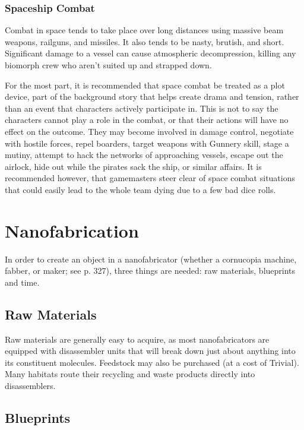 \subsubsection{Spaceship Combat} 

Combat in space tends to take place over long distances using massive beam weapons, railguns, and missiles. It also tends to be nasty, brutish, and short. Significant damage to a vessel can cause atmospheric decompression, killing any biomorph crew who aren't suited up and strapped down. 

For the most part, it is recommended that space combat be treated as a plot device, part of the background story that helps create drama and tension, rather than an event that characters actively participate in. This is not to say the characters cannot play a role in the combat, or that their actions will have no effect on the outcome. They may become involved in damage control, negotiate with hostile forces, repel boarders, target weapons with Gunnery skill, stage a mutiny, attempt to hack the networks of approaching vessels, escape out the airlock, hide out while the pirates sack the ship, or similar affairs. It is recommended however, that gamemasters steer clear of space combat situations that could easily lead to the whole team dying due to a few bad dice rolls. 

\section{Nanofabrication} 

In order to create an object in a nanofabricator (whether a cornucopia machine, fabber, or maker; see p. 327), three things are needed: raw materials, blueprints and time. 

\subsection{Raw Materials} 

Raw materials are generally easy to acquire, as most nanofabricators are equipped with disassembler units that will break down just about anything into its constituent molecules. Feedstock may also be purchased (at a cost of Trivial). Many habitats route their recycling and waste products directly into disassemblers. 

\subsection{Blueprints} 

